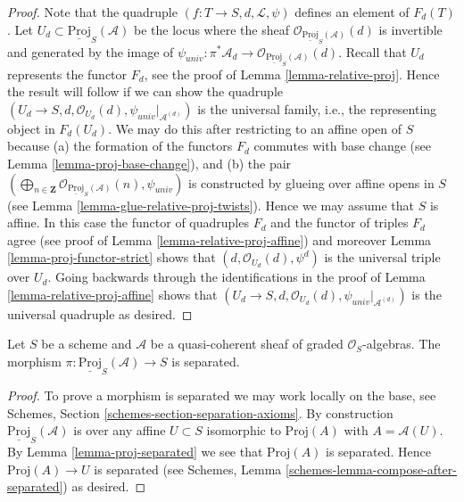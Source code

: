 \begin{proof}
Note that the quadruple $(f : T \to S, d, \mathcal{L}, \psi)$
defines an element of $F_d(T)$. Let
$U_d \subset \underline{\text{Proj}}_S(\mathcal{A})$
be the locus
where the sheaf $\mathcal{O}_{\underline{\text{Proj}}_S(\mathcal{A})}(d)$
is invertible and generated by the image of
$\psi_{univ} : \pi^*\mathcal{A}_d \to
\mathcal{O}_{\underline{\text{Proj}}_S(\mathcal{A})}(d)$.
Recall that $U_d$ represents the functor $F_d$, see the proof
of Lemma \ref{lemma-relative-proj}. Hence the result will follow
if we can show the quadruple
$(U_d \to S, d, \mathcal{O}_{U_d}(d), \psi_{univ}|_{\mathcal{A}^{(d)}})$
is the universal family, i.e., the representing object in $F_d(U_d)$.
We may do this after restricting to an affine open of $S$ because
(a) the formation of the functors $F_d$ commutes with base change
(see Lemma \ref{lemma-proj-base-change}), and (b) the pair
$(\bigoplus_{n \in \mathbf{Z}}
\mathcal{O}_{\underline{\text{Proj}}_S(\mathcal{A})}(n),
\psi_{univ})$ 
is constructed by glueing over affine opens in $S$
(see Lemma \ref{lemma-glue-relative-proj-twists}).
Hence we may assume that $S$ is affine. In this case the functor
of quadruples $F_d$ and the functor of triples $F_d$ agree
(see proof of Lemma \ref{lemma-relative-proj-affine}) and moreover
Lemma \ref{lemma-proj-functor-strict}
shows that $(d, \mathcal{O}_{U_d}(d), \psi^d)$
is the universal triple over $U_d$.
Going backwards through the identifications in the proof of
Lemma \ref{lemma-relative-proj-affine} shows that
$(U_d \to S, d, \mathcal{O}_{U_d}(d), \psi_{univ}|_{\mathcal{A}^{(d)}})$
is the universal quadruple as desired.
\end{proof}

\begin{lemma}
\label{lemma-relative-proj-separated}
Let $S$ be a scheme and $\mathcal{A}$ be a quasi-coherent sheaf
of graded $\mathcal{O}_S$-algebras. The morphism
$\pi : \underline{\text{Proj}}_S(\mathcal{A}) \to S$
is separated.
\end{lemma}

\begin{proof}
To prove a morphism is separated we may work locally on the base,
see Schemes, Section \ref{schemes-section-separation-axioms}. 
By construction $\underline{\text{Proj}}_S(\mathcal{A})$ is
over any affine $U \subset S$ isomorphic to
$\text{Proj}(A)$ with $A = \mathcal{A}(U)$. By
Lemma \ref{lemma-proj-separated} we see that $\text{Proj}(A)$ is separated.
Hence $\text{Proj}(A) \to U$ is separated (see
Schemes, Lemma \ref{schemes-lemma-compose-after-separated}) as desired.
\end{proof}

